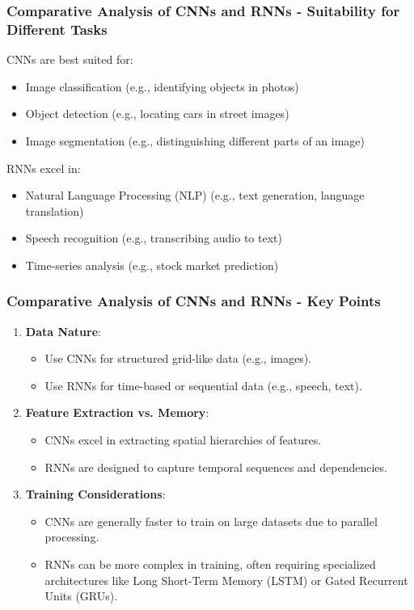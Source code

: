 \documentclass[aspectratio=169]{beamer}
\begin{document}
\begin{frame}[fragile]
    \frametitle{Comparative Analysis of CNNs and RNNs - Suitability for Different Tasks}
    \begin{block}{CNNs are best suited for:}
        \begin{itemize}
            \item Image classification (e.g., identifying objects in photos)
            \item Object detection (e.g., locating cars in street images)
            \item Image segmentation (e.g., distinguishing different parts of an image)
        \end{itemize}
    \end{block}

    \begin{block}{RNNs excel in:}
        \begin{itemize}
            \item Natural Language Processing (NLP) (e.g., text generation, language translation)
            \item Speech recognition (e.g., transcribing audio to text)
            \item Time-series analysis (e.g., stock market prediction)
        \end{itemize}
    \end{block}
\end{frame}

\begin{frame}[fragile]
    \frametitle{Comparative Analysis of CNNs and RNNs - Key Points}
    \begin{enumerate}
        \item \textbf{Data Nature}:
            \begin{itemize}
                \item Use CNNs for structured grid-like data (e.g., images).
                \item Use RNNs for time-based or sequential data (e.g., speech, text).
            \end{itemize}
        \item \textbf{Feature Extraction vs. Memory}:
            \begin{itemize}
                \item CNNs excel in extracting spatial hierarchies of features.
                \item RNNs are designed to capture temporal sequences and dependencies.
            \end{itemize}
        \item \textbf{Training Considerations}:
            \begin{itemize}
                \item CNNs are generally faster to train on large datasets due to parallel processing.
                \item RNNs can be more complex in training, often requiring specialized architectures like Long Short-Term Memory (LSTM) or Gated Recurrent Units (GRUs).
            \end{itemize}
    \end{enumerate}
\end{frame}
\end{document}

